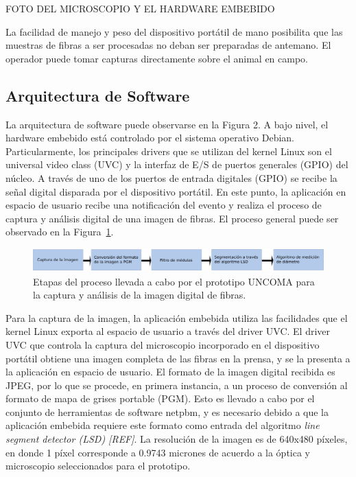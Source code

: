 \documentclass[runningheads,a4paper]{llncs}
\begin{document}
FOTO DEL MICROSCOPIO Y EL HARDWARE EMBEBIDO

La facilidad de manejo y peso del dispositivo portátil de mano posibilita que las muestras de fibras a ser procesadas no deban ser preparadas de antemano. El operador puede tomar capturas directamente sobre el animal en campo.


\subsection{Arquitectura de Software}


La arquitectura de software puede observarse en la Figura 2.
A bajo nivel, el hardware embebido está controlado por el sistema operativo Debian. Particularmente, los principales drivers que se utilizan del kernel Linux son el universal video class (UVC) y la interfaz de E/S de puertos generales (GPIO) del núcleo.
A través de uno de los puertos de entrada digitales (GPIO) se recibe la señal digital disparada por el dispositivo portátil. En este punto, la aplicación en espacio de usuario recibe una notificación del evento y realiza el proceso de captura y análisis digital de una imagen de fibras. El proceso general puede ser observado en la Figura~\ref{fig:proceso}.
\begin{figure}
\centering
\includegraphics[height=0.9cm]{proceso}
\caption{Etapas del proceso llevada a cabo por el prototipo UNCOMA para la captura y análisis de la imagen digital de fibras.
}
\label{fig:proceso}
\end{figure}


Para la captura de la imagen, la aplicación embebida utiliza las facilidades que el kernel Linux exporta al espacio de usuario a través del driver UVC. El driver UVC que controla la captura del microscopio incorporado en el dispositivo portátil obtiene una imagen completa de las fibras en la prensa, y se la presenta a la aplicación en espacio de usuario.
El formato de la imagen digital recibida es JPEG, por lo que se procede, en primera instancia, a un proceso de conversión al formato de mapa de grises portable (PGM). Esto es llevado a cabo por el conjunto de herramientas de software netpbm, y es necesario debido a que la aplicación embebida requiere este formato como entrada del algoritmo {\it line segment detector (LSD) [REF]}.
La resolución de la imagen es de 640x480 píxeles, en donde 1 píxel corresponde a 0.9743 micrones de acuerdo a la óptica y microscopio seleccionados para el prototipo.
\end{document}
